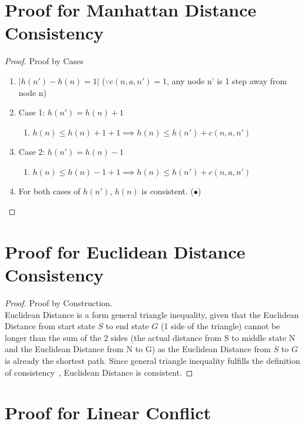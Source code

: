 \documentclass[runningheads]{llncs}
\begin{document}
\appendix
\section{Proof for Manhattan Distance Consistency}
\label{appendix:manhat_cons}
\begin{proof} Proof by Cases
    \begin{enumerate}
        \item \( |h(n') - h(n) = 1| \) (\( \because c(n, a, n') = 1 \), any node n' is 1 step away from node n)
        \item Case 1: \( h(n') = h(n) + 1 \)
        \begin{enumerate}
            \item \( h(n) \leq h(n) + 1 + 1 \implies h(n) \leq h(n') + c(n, a, n') \)
        \end{enumerate}
        \item Case 2: \( h(n') = h(n) - 1 \)
        \begin{enumerate}
            \item \( h(n) \leq h(n) - 1 + 1 \implies h(n) \leq h(n') + c(n, a, n') \)
        \end{enumerate}
        \item For both cases of \( h(n') \), \( h(n) \) is consistent. (\(\bullet\))
    \end{enumerate}
\end{proof}

\section{Proof for Euclidean Distance Consistency}
\label{appendix:euc_cons}

\begin{proof} Proof by Construction. \\
    Euclidean Distance is a form general triangle inequality, given that the Euclidean Distance from start state \( S \) to end state \( G \) (1 side of the triangle) cannot be longer than the sum of the 2 sides (the actual distance from S to middle state N and the Euclidean Distance from N to G) as the Euclidean Distance from \( S \) to \( G \) is already the shortest path. 
    Since general triangle inequality fulfills the definition of consistency~\cite[p95]{stuart_russell_artifical_2010}, Euclidean Distance is consistent.
\end{proof}

\section{Proof for Linear Conflict}
\label{appendix:linear_conflict}
\end{document}
